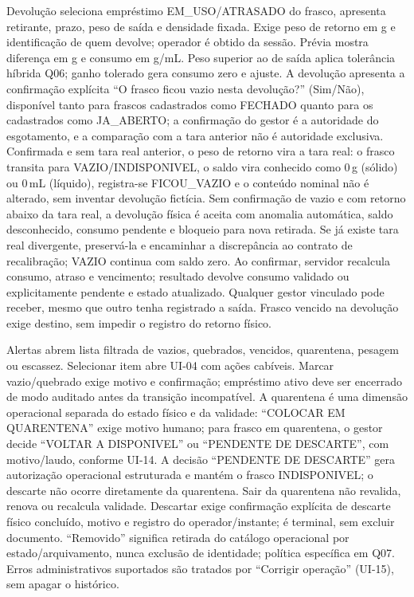 Devolução seleciona empréstimo EM\_USO/ATRASADO do frasco, apresenta retirante, prazo, peso de saída e densidade fixada. Exige peso de retorno em g e identificação de quem devolve; operador é obtido da sessão. Prévia mostra diferença em g e consumo em g/mL. Peso superior ao de saída aplica tolerância híbrida Q06; ganho tolerado gera consumo zero e ajuste. A devolução apresenta a confirmação explícita ``O frasco ficou vazio nesta devolução?'' (Sim/Não), disponível tanto para frascos cadastrados como FECHADO quanto para os cadastrados como JA\_ABERTO; a confirmação do gestor é a autoridade do esgotamento, e a comparação com a tara anterior não é autoridade exclusiva. Confirmada e sem tara real anterior, o peso de retorno vira a tara real: o frasco transita para VAZIO/INDISPONIVEL, o saldo vira conhecido como 0\,g (sólido) ou 0\,mL (líquido), registra-se FICOU\_VAZIO e o conteúdo nominal não é alterado, sem inventar devolução fictícia. Sem confirmação de vazio e com retorno abaixo da tara real, a devolução física é aceita com anomalia automática, saldo desconhecido, consumo pendente e bloqueio para nova retirada. Se já existe tara real divergente, preservá-la e encaminhar a discrepância ao contrato de recalibração; VAZIO continua com saldo zero. Ao confirmar, servidor recalcula consumo, atraso e vencimento; resultado devolve consumo validado ou explicitamente pendente e estado atualizado. Qualquer gestor vinculado pode receber, mesmo que outro tenha registrado a saída. Frasco vencido na devolução exige destino, sem impedir o registro do retorno físico.

Alertas abrem lista filtrada de vazios, quebrados, vencidos, quarentena, pesagem ou escassez. Selecionar item abre UI-04 com ações cabíveis. Marcar vazio/quebrado exige motivo e confirmação; empréstimo ativo deve ser encerrado de modo auditado antes da transição incompatível. A quarentena é uma dimensão operacional separada do estado físico e da validade: ``COLOCAR EM QUARENTENA'' exige motivo humano; para frasco em quarentena, o gestor decide ``VOLTAR A DISPONIVEL'' ou ``PENDENTE DE DESCARTE'', com motivo/laudo, conforme UI-14. A decisão ``PENDENTE DE DESCARTE'' gera autorização operacional estruturada e mantém o frasco INDISPONIVEL; o descarte não ocorre diretamente da quarentena. Sair da quarentena não revalida, renova ou recalcula validade. Descartar exige confirmação explícita de descarte físico concluído, motivo e registro do operador/instante; é terminal, sem excluir documento. ``Removido'' significa retirada do catálogo operacional por estado/arquivamento, nunca exclusão de identidade; política específica em Q07. Erros administrativos suportados são tratados por ``Corrigir operação'' (UI-15), sem apagar o histórico.

